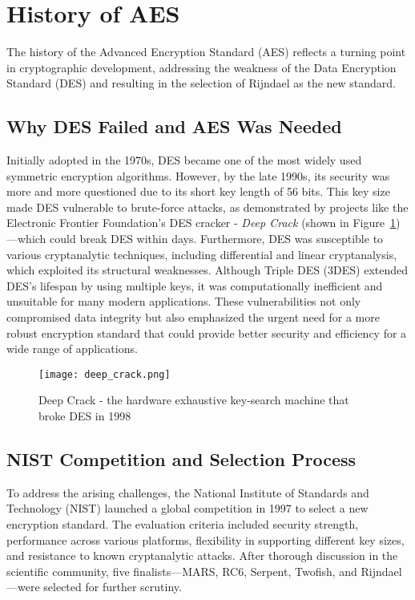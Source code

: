 \section{History of AES}

The history of the Advanced Encryption Standard (AES) reflects a turning point in cryptographic development, 
addressing the weakness of the Data Encryption Standard (DES) and resulting in the selection of Rijndael as the new standard.  

\subsection{Why DES Failed and AES Was Needed}

Initially adopted in the 1970s, DES became one of the most widely used symmetric encryption algorithms. However, by the late 1990s, 
its security was more and more questioned due to its short key length of 56 bits. This key size made DES vulnerable to brute-force attacks, 
as demonstrated by projects like the Electronic Frontier Foundation's DES cracker - \textit{Deep Crack} (shown in Figure~\ref{fig:deep-crack})—which could break DES within days. 
Furthermore, DES was susceptible to various cryptanalytic techniques, including differential and linear cryptanalysis, which exploited its structural weaknesses. 
Although Triple DES (3DES) extended DES's lifespan by using multiple keys, it was computationally inefficient and unsuitable for many modern applications.  
These vulnerabilities not only compromised data integrity but also emphasized the urgent need for a more robust encryption standard that could provide 
better security and efficiency for a wide range of applications. 

\begin{figure}[h] %
    \centering
    \texttt{[image: deep\_crack.png]} %
    \caption{
        Deep Crack - the hardware exhaustive key-search machine that broke DES in 1998
    }
    \label{fig:deep-crack} %
\end{figure}
 

\subsection{NIST Competition and Selection Process}

To address the arising challenges, the National Institute of Standards and Technology (NIST) launched a global competition in 1997 to select a new encryption standard. 
The evaluation criteria included security strength, performance across various platforms, flexibility in supporting different key sizes, and resistance to known cryptanalytic attacks. 
After thorough discussion in the scientific community, five finalists—MARS, RC6, Serpent, Twofish, and Rijndael—were selected for further scrutiny. \newline 


